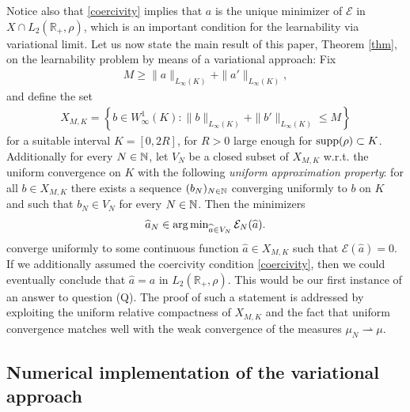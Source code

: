 Notice also that \eqref{coercivity} implies that $a$ is the unique minimizer of $\mathcal E$ in $X \cap  L_2(\mathbb R_+,\rho)$,
which is an important condition for the learnability via variational limit. 
Let us now state the main result of this paper, Theorem \ref{thm},  on the learnability problem by means of a variational approach: Fix 
\begin{align*}
	M \geq \|a\|_{L_{\infty}(K)} + \|a'\|_{L_{\infty}(K)},
	\end{align*}
and define the set
\begin{align*}
X_{M,K} = \left\{b \in W^{1}_{\infty}(K) :
 \|b\|_{L_{\infty}(K)} + \|b'\|_{L_{\infty}(K)} \leq M
 \right\}
\end{align*}
for a suitable interval $K=[0,2 R]$, for $R>0$ large enough for $\operatorname{supp}(\rho) \subset K$.
Additionally for every $N \in \mathbb{N}$, let $V_N$ be a closed subset of $X_{M,K}$ w.r.t. the uniform convergence on $K$ with the following {\it uniform approximation property}: for all $b\in X_{M,K}$ there exists a sequence $(b_N)_{N \in \mathbb{N}}$ converging uniformly to $b$ on $K$ and such that $b_N\in V_N$ for every $N \in \mathbb{N}$. Then the minimizers 
	\begin{align} \label{truealgo1}
		\widehat a_N\in\operatorname{arg\,min}_{\widehat a\in V_N} \mathcal E_N(\widehat a).
	\end{align}
 converge uniformly to some continuous function $\widehat a \in X_{M,K}$ such that
	$\mathcal E(\widehat a)=0$. If we additionally assumed the coercivity condition \eqref{coercivity}, then we could eventually conclude that 
	$\widehat a=a$ in $L_2(\mathbb R_+, \rho)$. This would be our first instance of an answer to question (Q). The proof of such a statement is  addressed by exploiting the uniform relative compactness of $X_{M,K}$
and the fact that uniform convergence matches well with the weak convergence of the measures $\mu_N \rightharpoonup \mu$.


\subsection{Numerical implementation of the variational approach }\label{sec:wp3}

